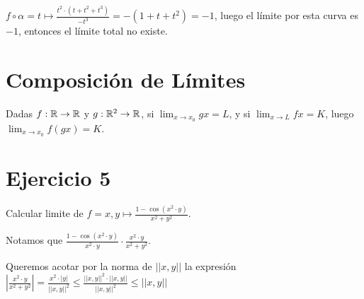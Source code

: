 \documentclass{article}
\begin{document}
$f \circ \alpha = t\mapsto \frac{t^2 \cdot (t + t^2 + t^3)}{-t^3} = -(1 + t + t^2) = -1$,
luego el límite por esta curva es $-1$, entonces el límite total no existe.

\section{Composición de Límites}
Dadas $f : \mathbb{R} \to \mathbb{R}$ y $g : \mathbb{R}^2 \to \mathbb{R}$, si $\lim_{x \to x_0} gx = L$, y si
$\lim_{x \to L} fx = K$, luego $\lim_{x \to x_0} f (gx) = K$.

\section{Ejercicio 5}
Calcular limite de $f = x,y \mapsto \frac{1 - \cos (x^2 \cdot y)}{x^2 + y^2} $.

Notamos que $\frac{1 - \cos(x^2 \cdot y)}{x^2 \cdot y} \cdot \frac{x^2 \cdot y}{x^2 + y^2}$.

Queremos acotar por la norma de $||x,y||$ la expresión
$\left|\frac{x^2 \cdot y}{x^2 + y^2}\right| =
\frac{x^2 \cdot |y|}{||x,y||^2} \leq
\frac{||x,y||^2 \cdot ||x,y||}{||x,y||^2} \leq
||x,y||$
\end{document}
